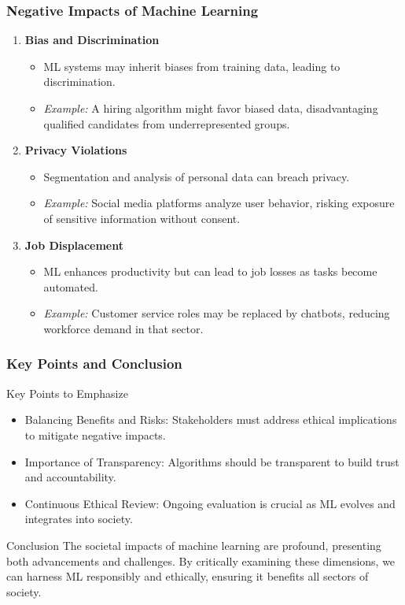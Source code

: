 \documentclass[aspectratio=169]{beamer}
\begin{document}
\begin{frame}[fragile]
    \frametitle{Negative Impacts of Machine Learning}
    \begin{enumerate}
        \item \textbf{Bias and Discrimination}
        \begin{itemize}
            \item ML systems may inherit biases from training data, leading to discrimination.
            \item \textit{Example:} A hiring algorithm might favor biased data, disadvantaging qualified candidates from underrepresented groups.
        \end{itemize}

        \item \textbf{Privacy Violations}
        \begin{itemize}
            \item Segmentation and analysis of personal data can breach privacy.
            \item \textit{Example:} Social media platforms analyze user behavior, risking exposure of sensitive information without consent.
        \end{itemize}

        \item \textbf{Job Displacement}
        \begin{itemize}
            \item ML enhances productivity but can lead to job losses as tasks become automated.
            \item \textit{Example:} Customer service roles may be replaced by chatbots, reducing workforce demand in that sector.
        \end{itemize}
    \end{enumerate}
\end{frame}

\begin{frame}[fragile]
    \frametitle{Key Points and Conclusion}
    \begin{block}{Key Points to Emphasize}
        \begin{itemize}
            \item Balancing Benefits and Risks: Stakeholders must address ethical implications to mitigate negative impacts.
            \item Importance of Transparency: Algorithms should be transparent to build trust and accountability.
            \item Continuous Ethical Review: Ongoing evaluation is crucial as ML evolves and integrates into society.
        \end{itemize}
    \end{block}
    
    \begin{block}{Conclusion}
        The societal impacts of machine learning are profound, presenting both advancements and challenges. By critically examining these dimensions, we can harness ML responsibly and ethically, ensuring it benefits all sectors of society.
    \end{block}
\end{frame}
\end{document}
